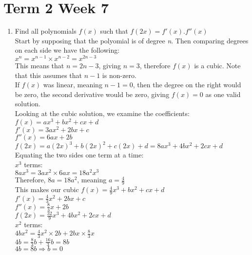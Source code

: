 \documentclass[../main.tex]{subfiles}
\begin{document}
\section*{Term 2 Week 7}
\begin{enumerate}
    \item 
    Find all polynomials \(f(x)\) such that \(f(2x)=f'(x).f''(x)\)\\

    Start by supposing that the polyomial is of degree \textit{n}. Then comparing degrees on each side we have the following:\\
    \(x^n=x^{n-1} \times x^{n-2}=x^{2n-3}\)\\

    This means that \(n=2n-3\), giving \(n=3\), therefore \(f(x)\) is a cubic. Note that this assumes that \(n-1\) is non-zero.\\

    If \(f(x)\) was linear, meaning \(n-1=0\), then the degree on the right would be zero, the second derivative would be zero, giving \(f(x)=0\) as one valid solution.\\

    Looking at the cubic solution, we examine the coefficients:\\
    \(f(x)=ax^3+bx^2+cx+d\)\\

    \(f'(x)=3ax^2+2bx+c\)\\
    \(f''(x)=6ax+2b\)\\
    \(f(2x)=a(2x)^3+b(2x)^2+c(2x)+d=8ax^3+4bx^2+2cx+d\)\\

    Equating the two sides one term at a time:\\
    \(x^3\) terms:\\
    \(8ax^3=3ax^2 \times 6ax=18a^2x^3\)\\
    Therefore, \(8a=18a^2\), meaning \(a=\frac{4}{9}\)\\

    This makes our cubic \(f(x)=\frac{4}{9}x^3+bx^2+cx+d\)\\

    \(f'(x)=\frac{4}{3}x^2+2bx+c\)\\
    \(f''(x)=\frac{8}{3}x+2b\)\\
    \(f(2x)=\frac{32}{9}x^3+4bx^2+2cx+d\)\\

    \(x^2\) terms:\\
    \(4bx^2=\frac{4}{3}x^2 \times 2b + 2bx \times \frac{8}{3}x\)\\
    \(4b=\frac{8}{3}b+\frac{16}{3}b=8b\)\\
    \(4b=8b \Rightarrow b=0\)\\


\end{enumerate}
\end{document}
